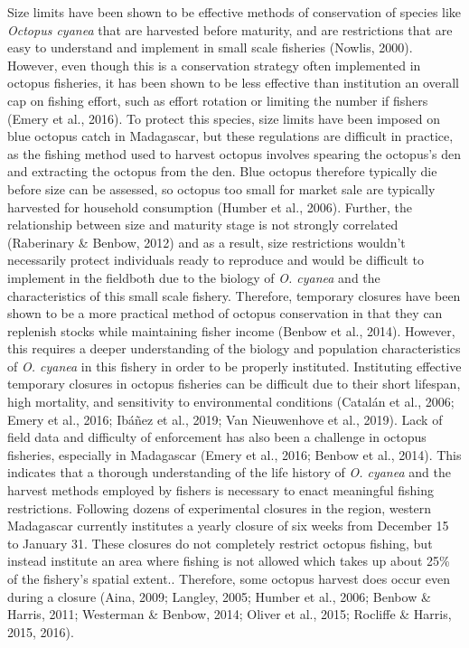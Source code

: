 \documentclass[
]{article}
\begin{document}
Size limits have been shown to be effective methods of conservation of species like \emph{Octopus cyanea} that are harvested before maturity, and are restrictions that are easy to understand and implement in small scale fisheries (Nowlis, 2000). However, even though this is a conservation strategy often implemented in octopus fisheries, it has been shown to be less effective than institution an overall cap on fishing effort, such as effort rotation or limiting the number if fishers (Emery et al., 2016). To protect this species, size limits have been imposed on blue octopus catch in Madagascar, but these regulations are difficult in practice, as the fishing method used to harvest octopus involves spearing the octopus's den and extracting the octopus from the den. Blue octopus therefore typically die before size can be assessed, so octopus too small for market sale are typically harvested for household consumption (Humber et al., 2006). Further, the relationship between size and maturity stage is not strongly correlated (Raberinary \& Benbow, 2012) and as a result, size restrictions wouldn't necessarily protect individuals ready to reproduce and would be difficult to implement in the fieldboth due to the biology of \emph{O. cyanea} and the characteristics of this small scale fishery. Therefore, temporary closures have been shown to be a more practical method of octopus conservation in that they can replenish stocks while maintaining fisher income (Benbow et al., 2014). However, this requires a deeper understanding of the biology and population characteristics of \emph{O. cyanea} in this fishery in order to be properly instituted. Instituting effective temporary closures in octopus fisheries can be difficult due to their short lifespan, high mortality, and sensitivity to environmental conditions (Catalán et al., 2006; Emery et al., 2016; Ibáñez et al., 2019; Van Nieuwenhove et al., 2019). Lack of field data and difficulty of enforcement has also been a challenge in octopus fisheries, especially in Madagascar (Emery et al., 2016; Benbow et al., 2014). This indicates that a thorough understanding of the life history of \emph{O. cyanea} and the harvest methods employed by fishers is necessary to enact meaningful fishing restrictions. Following dozens of experimental closures in the region, western Madagascar currently institutes a yearly closure of six weeks from December 15 to January 31. These closures do not completely restrict octopus fishing, but instead institute an area where fishing is not allowed which takes up about 25\% of the fishery's spatial extent.. Therefore, some octopus harvest does occur even during a closure (Aina, 2009; Langley, 2005; Humber et al., 2006; Benbow \& Harris, 2011; Westerman \& Benbow, 2014; Oliver et al., 2015; Rocliffe \& Harris, 2015, 2016).
\end{document}
